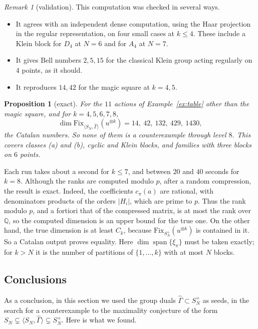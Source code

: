\documentclass[11pt]{amsart}
\newtheorem{proposition}[theorem]{Proposition}
\theoremstyle{definition}
\theoremstyle{remark}
\newtheorem{remark}[theorem]{Remark}
\theoremstyle{plain}
\numberwithin{equation}{section}
\numberwithin{table}{section}
\newcommand{\Q}{\mathbb Q}
\newcommand{\Fix}{\mathrm{Fix}}
\DeclareMathOperator{\spn}{span}
\begin{document}
\begin{remark}[validation]
This computation was checked in several ways.
\begin{itemize}
\item It agrees with an independent dense computation, using the Haar projection in the regular representation, on four small cases at $k\le4$. These include a Klein block for $D_4$ at $N=6$ and for $A_4$ at $N=7$.
\item It gives Bell numbers $2,5,15$ for the classical Klein group acting regularly on $4$ points, as it should.
\item It reproduces $14,42$ for the magic square at $k=4,5$.
\end{itemize}
\end{remark}

\begin{proposition}[exact]\label{prop:dualcomp}
For the $11$ actions of Example~\ref{ex:table} other than the magic square, and for $k=4,5,6,7,8$,
\[
\dim\Fix_{\langle S_N,\widehat\Gamma\rangle}(u^{\otimes k})=14,\ 42,\ 132,\ 429,\ 1430,
\]
the Catalan numbers. So none of them is a counterexample through level $8$. This covers classes (a) and (b), cyclic and Klein blocks, and families with three blocks on $6$ points.
\end{proposition}

Each run takes about a second for $k\le7$, and between $20$ and $40$ seconds for $k=8$. Although the ranks are computed modulo $p$, after a random compression, the result is exact. Indeed, the coefficients $c_\pi(a)$ are rational, with denominators products of the orders $|H_i|$, which are prime to $p$. Thus the rank modulo $p$, and a fortiori that of the compressed matrix, is at most the rank over $\Q$, so the computed dimension is an upper bound for the true one. On the other hand, the true dimension is at least $C_k$, because $\Fix_{S_N^+}(u^{\otimes k})$ is contained in it. So a Catalan output proves equality. Here $\dim\spn\{\xi_\pi\}$ must be taken exactly; for $k>N$ it is the number of partitions of $\{1,\dots,k\}$ with at most $N$ blocks.

\subsection{Conclusions}\label{sec:dualsconcl}

As a conclusion, in this section we used the group duals $\widehat\Gamma\subset S_N^+$ as seeds, in the search for a counterexample to the maximality conjecture of the form $S_N\subsetneq\langle S_N,\widehat\Gamma\rangle\subsetneq S_N^+$. Here is what we found.
\end{document}
